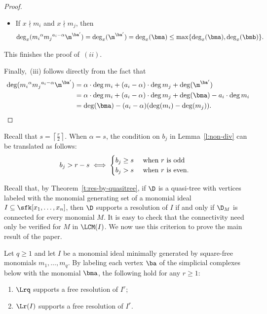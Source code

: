 \begin{proof}
\begin{itemize}
    
   \item If $x\nmid m_i$ and $x\nmid m_j$, then
     $$\deg_x({m_i}^\alpha{m_j}^{a_i-\alpha}\m^{\ba'}) = \deg_x(\m^{\ba'}) = \deg_x(\bma) \leq \max \{
     \deg_x(\bma), \deg_x(\bmb) \}.$$
\end{itemize}

   This finishes the proof of~$(ii)$.

   Finally,~\textup{(}iii\textup{)} follows directly from the fact that
\begin{align*}
\deg({m_i}^{\alpha}{m_j}^{a_i-\alpha}\m^{\ba'}) &= \alpha \cdot \deg m_i+(a_i-\alpha) \cdot \deg m_j + \deg (\m^{\ba'}) \\
&= \alpha \cdot \deg m_i+(a_i-\alpha) \cdot \deg m_j + \deg (\bma) - a_i \cdot \deg m_i \\
&= \deg(\bma)-(a_i-\alpha)(\deg(m_i)-\deg(m_j)). 
\end{align*}
\end{proof}


\begin{rema}
\label{r:connection}
Recall that $s=\left\lceil{\frac{r}{2}}\right\rceil$. When $\alpha=s$, the condition on $b_j$ in Lemma~\ref{l:non-div} can be translated as follows: 
$$
b_j>r-s\iff \begin{cases} \text{$b_j\ge s$ \quad when $r$ is odd}\\
\text{$b_j>s$ \quad when $r$ is even.}
\end{cases} 
$$
\end{rema}

Recall that, by Theorem~\ref{t:res-by-quasitree}, if $\D$ is a quasi-tree
with vertices labeled with the monomial generating set of a monomial
ideal $I \subseteq \sfk[x_1, \ldots, x_n]$, then $\D$ supports a
resolution of $I$ if and only if $\D_M$ is connected for every
monomial $M$. It is easy to check that the connectivity need only be
verified for $M$ in $\LCM(I)$.  We now use this criterion to prove the
main result of the paper.

\begin{theorem}\label{t:main}
  Let $q\ge 1$ and let $I$ be a monomial ideal minimally generated by
  square-free monomials $m_1, \dots, m_q$.  By labeling each vertex
  $\ba$ of the simplicial complexes below with the monomial $\bma$, the
  following hold for any $r\ge 1$:
\begin{enumerate}[label=\textup{(}\roman*\textup{)}] 
\item $\Lrq$ supports a free resolution of $I^r$;
\item $\Lr(I)$ supports a free resolution of $I^r$.
\end{enumerate}
\end{theorem}

